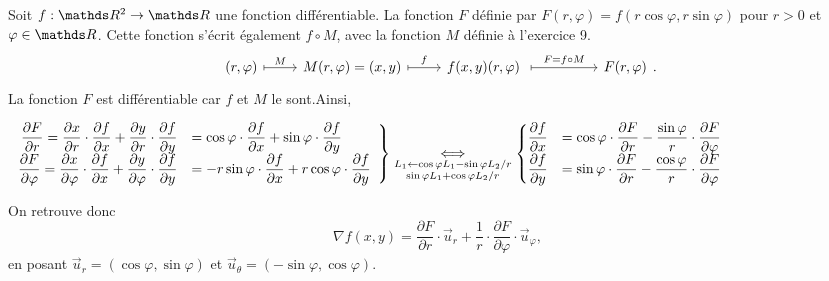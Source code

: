 \begin{exm}
	Soit $f : \R^2 \to \R$ une fonction différentiable.
	La fonction $F$ définie par $F(r, \varphi) = f(r \cos \varphi, r \sin \varphi)$ pour $r > 0$ et $\varphi \in \R$.
	Cette fonction s'écrit également $f \circ M$, avec la fonction $M$ définie à l'exercice 9.
	\[
		\begin{tikzcd}
			(r, \varphi) \ar[r, mapsto, "M"] & M(r, \varphi) = (x,y) \ar[r, mapsto, "f"] & f(x,y)
			(r, \varphi) \ar[rr, mapsto, "F = f \circ M"] && F(r, \varphi)
		\end{tikzcd}
	.\]
	La fonction $F$ est différentiable car $f$ et $M$ le sont.\footnotemark\@ Ainsi,

	\begin{adjustbox}{center}
		\null\bigskip\null
		$\left.\begin{array}{rl}
			\displaystyle\frac{\partial F}{\partial r} = \frac{\partial x}{\partial r} \cdot \frac{\partial f}{\partial x} + \frac{\partial y}{\partial r} \cdot \frac{\partial f}{\partial y} &\displaystyle= \cos \varphi \cdot \frac{\partial f}{\partial x} + \sin \varphi \cdot \frac{\partial f}{\partial y}
			\\
			\displaystyle\frac{\partial F}{\partial \varphi} = \frac{\partial x}{\partial \varphi} \cdot \frac{\partial f}{\partial x} + \frac{\partial y}{\partial \varphi} \cdot \frac{\partial f}{\partial y} &\displaystyle= -r \sin \varphi \cdot \frac{\partial f}{\partial x} + r \cos\varphi \cdot \frac{\partial f}{\partial y}
		\end{array}\right\}
		\underset{\substack{L_1 \gets \cos \varphi L_1 - \sin\varphi L_2 / r\\ \sin \varphi L_1 + \cos \varphi L_2 / r}}\iff
		\begin{cases}
			\displaystyle\frac{\partial f}{\partial x} &\displaystyle= \cos \varphi \cdot \frac{\partial F}{\partial r} - \frac{\sin \varphi}{r} \cdot \frac{\partial F}{\partial \varphi}\\
			\displaystyle\frac{\partial f}{\partial y} &\displaystyle= \sin \varphi \cdot \frac{\partial F}{\partial r} - \frac{\cos \varphi}{r} \cdot \frac{\partial F}{\partial \varphi}\\
		\end{cases}$
		\null\bigskip\null
	\end{adjustbox}
	On retrouve donc \[
		\nabla f(x,y) = \frac{\partial F}{\partial r} \cdot \vec{u}_r + \frac{1}{r} \cdot \frac{\partial F}{\partial \varphi} \cdot \vec{u}_{\varphi}
	,\]en posant $\vec{u}_r = (\cos \varphi, \sin \varphi)$ et $\vec{u}_\theta = (-\sin \varphi, \cos \varphi)$.
\end{exm}


